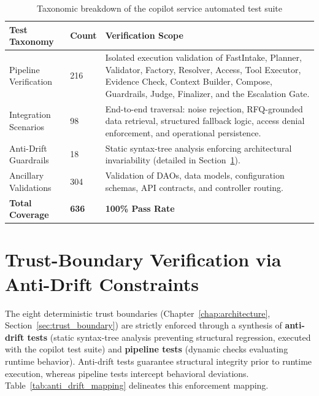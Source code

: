 \begin{table}[H]
\centering
\scriptsize
\renewcommand{\arraystretch}{1.3}
\begin{tabularx}{\textwidth}{|p{3cm}|p{1.8cm}|>{\RaggedRight\arraybackslash}X|}
\hline
\rowcolor{lightgray}
\textbf{Test Taxonomy} & \textbf{Count} & \textbf{Verification Scope} \\ \hline
Pipeline Verification & 216 & Isolated execution validation of FastIntake, Planner, Validator, Factory, Resolver, Access, Tool Executor, Evidence Check, Context Builder, Compose, Guardrails, Judge, Finalizer, and the Escalation Gate. \\ \hline
Integration Scenarios & 98 & End-to-end traversal: noise rejection, RFQ-grounded data retrieval, structured fallback logic, access denial enforcement, and operational persistence. \\ \hline
Anti-Drift Guardrails & 18 & Static syntax-tree analysis enforcing architectural invariability (detailed in Section~\ref{sec:trust_boundary_verification}). \\ \hline
Ancillary Validations & 304 & Validation of DAOs, data models, configuration schemas, API contracts, and controller routing. \\ \hline
\textbf{Total Coverage} & \textbf{636} & \textbf{100\% Pass Rate} \\ \hline
\end{tabularx}
\caption{Taxonomic breakdown of the copilot service automated test suite}
\label{tab:copilot_tests}
\end{table}

\section{Trust-Boundary Verification via Anti-Drift Constraints}\label{sec:trust_boundary_verification}
The eight deterministic trust boundaries (Chapter~\ref{chap:architecture}, Section~\ref{sec:trust_boundary}) are strictly enforced through a synthesis of \textbf{anti-drift tests} (static syntax-tree analysis preventing structural regression, executed with the copilot test suite) and \textbf{pipeline tests} (dynamic checks evaluating runtime behavior). Anti-drift tests guarantee structural integrity prior to runtime execution, whereas pipeline tests intercept behavioral deviations. Table~\ref{tab:anti_drift_mapping} delineates this enforcement mapping.

